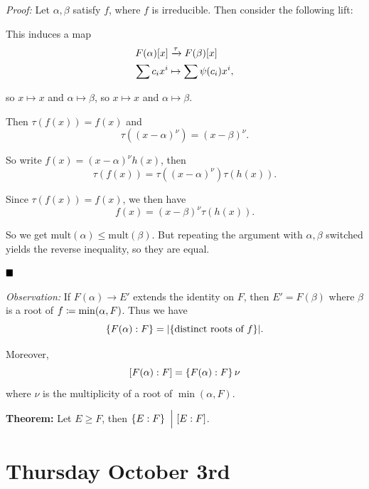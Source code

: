 \emph{Proof:} Let \(\alpha, \beta\) satisfy \(f\), where \(f\) is
irreducible. Then consider the following lift:

\begin{center}
\end{center}

This induces a map \begin{align*}
F(\alpha)[x] &\xrightarrow{\tau} F(\beta)[x] \\
\sum c_i x^i &\mapsto \sum \psi(c_i) x^i
,\end{align*}

so \(x\mapsto x\) and \(\alpha \mapsto \beta\), so \(x\mapsto x\) and
\(\alpha \mapsto \beta\).

Then \(\tau(f(x)) = f(x)\) and \[
\tau((x-\alpha)^\nu) = (x-\beta)^\nu
.\]

So write \(f(x) = (x-\alpha)^\nu h(x)\), then \[
\tau(f(x)) = \tau((x-\alpha)^\nu) \tau(h(x))
.\]

Since \(\tau(f(x)) = f(x)\), we then have \[
f(x) = (x-\beta)^\nu \tau(h(x))
.\]

So we get \(\mathrm{mult}(\alpha) \leq \mathrm{mult}(\beta)\). But
repeating the argument with \(\alpha, \beta\) switched yields the
reverse inequality, so they are equal.

\(\qed\)

\emph{Observation:} If \(F(\alpha) \to E'\) extends the identity on
\(F\), then \(E' = F(\beta)\) where \(\beta\) is a root of
\(f \coloneqq \min(\alpha, F)\). Thus we have \[
\left\{{F(\alpha): F}\right\} = {\left\lvert {\left\{{\text{distinct roots of } f}\right\}} \right\rvert}
.\]

Moreover, \[
[F(\alpha): F] = \left\{{F(\alpha) : F}\right\} \nu
\] where \(\nu\) is the multiplicity of a root of \(\min(\alpha, F)\).

\textbf{Theorem:} Let \(E \geq F\), then
\(\left\{{E: F}\right\} {~\Bigm| ~} [E: F]\).

\hypertarget{thursday-october-3rd}{%
\section{Thursday October 3rd}\label{thursday-october-3rd}}

